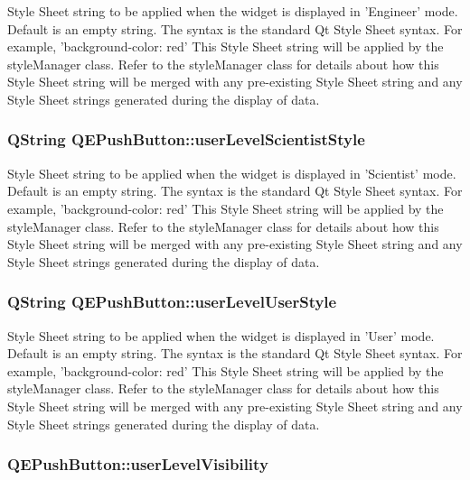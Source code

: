 Style Sheet string to be applied when the widget is displayed in 'Engineer' mode. Default is an empty string. The syntax is the standard Qt Style Sheet syntax. For example, 'background-\/color: red' This Style Sheet string will be applied by the styleManager class. Refer to the styleManager class for details about how this Style Sheet string will be merged with any pre-\/existing Style Sheet string and any Style Sheet strings generated during the display of data. \hypertarget{classQEPushButton_a53f440b11919a757045b0fc46bcbfa97}{
\subsubsection[{userLevelScientistStyle}]{\setlength{\rightskip}{0pt plus 5cm}QString QEPushButton::userLevelScientistStyle}}
\label{classQEPushButton_a53f440b11919a757045b0fc46bcbfa97}
Style Sheet string to be applied when the widget is displayed in 'Scientist' mode. Default is an empty string. The syntax is the standard Qt Style Sheet syntax. For example, 'background-\/color: red' This Style Sheet string will be applied by the styleManager class. Refer to the styleManager class for details about how this Style Sheet string will be merged with any pre-\/existing Style Sheet string and any Style Sheet strings generated during the display of data. \hypertarget{classQEPushButton_a70367130f27010d02c5b99ba5efc1a71}{
\subsubsection[{userLevelUserStyle}]{\setlength{\rightskip}{0pt plus 5cm}QString QEPushButton::userLevelUserStyle}}
\label{classQEPushButton_a70367130f27010d02c5b99ba5efc1a71}
Style Sheet string to be applied when the widget is displayed in 'User' mode. Default is an empty string. The syntax is the standard Qt Style Sheet syntax. For example, 'background-\/color: red' This Style Sheet string will be applied by the styleManager class. Refer to the styleManager class for details about how this Style Sheet string will be merged with any pre-\/existing Style Sheet string and any Style Sheet strings generated during the display of data. \hypertarget{classQEPushButton_ad95a2bf16f07fbb22fb66bb8e61c02d1}{
\subsubsection[{userLevelVisibility}]{ QEPushButton::userLevelVisibility}}

